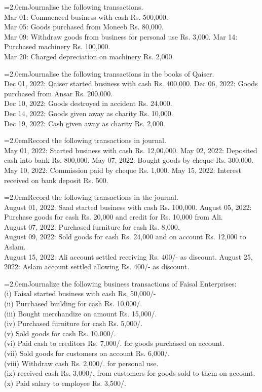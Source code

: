 \documentclass[11pt,a4paper]{article}
\newcommand{\lqn}[2]{\Needspace{6\baselineskip}\par\medskip\noindent\hangindent=2.0em\hangafter=1\makebox[2.0em][l]{\textbf{#1.}}#2\par}
\begin{document}
\lqn{16}{Journalise the following transactions.\\
Mar 01: Commenced business with cash Rs. 500,000.\\
Mar 05: Goods purchased from Moneeb Rs. 80,000.\\
Mar 09: Withdraw goods from business for personal use Rs. 3,000. Mar 14: Purchased machinery Rs. 100,000.\\
Mar 20: Charged depreciation on machinery Rs. 2,000.\par
}
\lqn{17}{Journalise the following transactions in the books of Qaiser.\\
Dec 01, 2022:    Qaiser started business with cash Rs. 400,000. Dec 06, 2022:    Goods purchased from Ansar Rs. 200,000.\\
Dec 10, 2022:    Goods destroyed in accident Rs. 24,000.\\
Dec 14, 2022:    Goods given away as charity Rs. 10,000.\\
Dec 19, 2022:    Cash given away as charity Rs. 2,000.\par
}
\lqn{18}{Record the following transactions in journal.\\
May 01, 2022:   Started business with cash Rs. 12,00,000. May 02, 2022:   Deposited cash into bank Rs. 800,000. May 07, 2022:   Bought goods by cheque Rs. 300,000. May 10, 2022:   Commission paid by cheque Rs. 1,000. May 15, 2022:   Interest received on bank deposit Rs. 500.\par
}
\lqn{19}{Record the following transactions in the journal.\\
August 01, 2022:           Saad started business with cash Rs. 100,000. August 05, 2022:           Purchase goods for cash Rs. 20,000 and credit for Rs. 10,000 from Ali.\\
August 07, 2022:           Purchased furniture for cash Rs. 8,000.\\
August 09, 2022:           Sold goods for cash Rs. 24,000 and on account Rs. 12,000 to Aslam.\\
August 15, 2022:           Ali account settled receiving Rs. 400/- as discount. August 25, 2022:           Aslam account settled allowing Rs. 400/- as discount.\par
}
\lqn{20}{Journalize the following business transactions of Faisal Enterprises:\\
(i) Faisal started business with cash Rs, 50,000/-\\
(ii) Purchased building for cash Rs. 10,000/.\\
(iii) Bought merchandize on amount Rs. 15,000/.\\
(iv) Purchased furniture for cash Rs. 5,000/.\\
(v) Sold goods for cash Rs. 10.000/.\\
(vi) Paid cash to creditors Rs. 7,000/. for goods purchased on account.\\
(vii) Sold goods for customers on account Rs. 6,000/.\\
(viii) Withdraw cash Rs. 2,000/. for personal use.\\
(ix) received cash Rs. 3,000/. from customers for goods sold to them on account.\\
(x) Paid salary to employee Rs. 3,500/.\par
}
\end{document}
